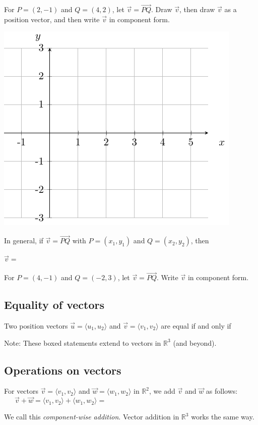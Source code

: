 \vspace{1in}

\begin{ex}
    For $P=(2,-1)$ and $Q=(4,2)$, let $\vec{v}=\vec{PQ}$. Draw $\vec{v}$, then draw $\vec{v}$ as a position vector, and then write $\vec{v}$ in component form.
    
    \includegraphics[width=.3\textwidth]{tikz-pictures/section-9.2-pic1-axes-for-vectors.pdf}
\end{ex}

\begin{framed}
    In general, if $\vec{v}=\vec{PQ}$ with $P=(x_1,y_1)$ and $Q=(x_2,y_2)$, then 
    \medskip 

    $\vec{v}=\phantom{\langle x_2-x_1, y_2-y_1\rangle.}$\\ \mbox{}
\end{framed}
\begin{ex}
    For $P=(4,-1)$ and $Q=(-2,3)$, let $\vec{v}=\vec{PQ}$. Write $\vec{v}$ in component form.
\end{ex}

\vfill

\subsection{Equality of vectors}
\begin{framed} 
    Two position vectors $\vec{u}=\langle u_1,u_2\rangle$ and $\vec{v}=\langle v_1,v_2\rangle$ are equal if and only if \\
\end{framed}
Note: These boxed statements extend to vectors in $\mathbb{R}^3$ (and beyond).
\pagebreak 

\subsection{Operations on vectors}
\begin{defn}
    For vectors $\vec{v}=\langle v_1,v_2\rangle$ and $\vec{w}=\langle w_1,w_2\rangle$ in $\mathbb{R}^2$, we add $\vec{v}$ and $\vec{w}$ as follows:
    \[
        \vec{v}+\vec{w}=\langle v_1,v_2\rangle+\langle w_1,w_2\rangle = \phantom{\langle v_1+w_1,v_2+w_2\rangle.}\hspace{2in}
    \]
\end{defn}
We call this \emph{component-wise addition}. Vector addition in $\mathbb{R}^3$ works the same way.

